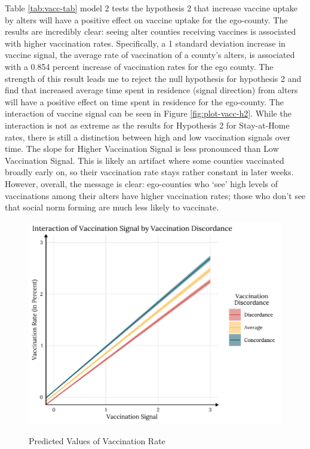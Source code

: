 Table \ref{tab:vacc-tab} model 2 tests the hypothesis 2 that increase vaccine
uptake by alters will have a positive effect on vaccine uptake for the
ego-county. The results are incredibly clear: seeing alter counties receiving
vaccines is associated with higher vaccination rates. Specifically, a 1 standard
deviation increase in vaccine signal, the average rate of vaccination of a
county's alters, is associated with a
0.854
percent increase of vaccination rates for the ego county. The strength of this
result leads me to reject the null hypothesis for hypothesis 2 and find that
increased average time spent in residence (signal direction) from alters will
have a positive effect on time spent in residence for the ego-county. The
interaction of vaccine signal can be seen in Figure \ref{fig:plot-vacc-h2}.
While the interaction is not as extreme as the results for Hypothesis 2 for
Stay-at-Home rates, there is still a distinction between high and low
vaccination signals over time. The slope for Higher Vaccination Signal is less
pronounced than Low Vaccination Signal. This is likely an artifact where some
counties vaccinated broadly early on, so their vaccination rate stays rather
constant in later weeks. However, overall, the message is clear: ego-counties
who `see' high levels of vaccinations among their alters have higher vaccination
rates; those who don't see that social norm forming are much less likely to
vaccinate.

\begin{figure}
{\centering \includegraphics[width=0.8\linewidth]{figs/paper3/plot-vacc-h3-1}}
\caption{Predicted Values of Vaccination Rate}\label{fig:plot-vacc-h3}
\end{figure}

